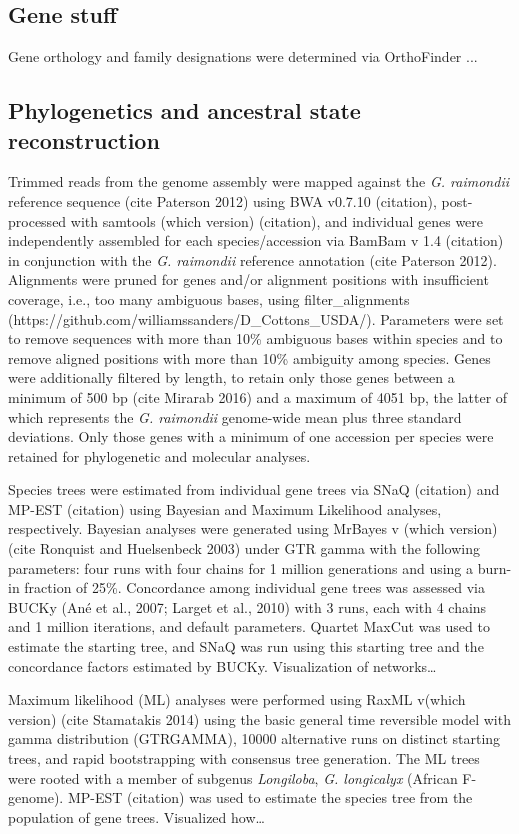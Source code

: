 \documentclass{bmcart}
\newcommand{\note}[2][]{\added[id=#1,remark={#2}]{}}
\begin{document}
\subsection*{Gene stuff}
Gene orthology and family designations were determined via OrthoFinder \note[Corrinne]{citation}...

\subsection*{Phylogenetics and ancestral state reconstruction}
Trimmed reads from the genome assembly were mapped against the \textit{G. raimondii} reference sequence (cite Paterson 2012) using BWA v0.7.10 (citation), post-processed with samtools (which version) (citation), and individual genes were independently assembled for each species/accession via BamBam v 1.4  (citation) in conjunction with the \textit{G. raimondii} reference annotation (cite Paterson 2012).  Alignments were pruned for genes and/or alignment positions with insufficient coverage, i.e., too many ambiguous bases, using filter\_alignments (https://github.com/williamssanders/D\_Cottons\_USDA/). Parameters were set  to remove sequences with more than 10\% ambiguous bases within species and to remove aligned positions with more than 10\% ambiguity among species. Genes were additionally filtered by length, to retain only those genes between a minimum of 500 bp (cite Mirarab 2016) and a maximum of 4051 bp, the latter of which represents the \textit{G. raimondii} genome-wide mean plus three standard deviations. Only those genes with a minimum of one accession per species were retained for phylogenetic and molecular analyses. 

Species trees were estimated from individual gene trees via SNaQ (citation) and MP-EST (citation) using Bayesian and Maximum Likelihood analyses, respectively. Bayesian analyses were generated using MrBayes v (which version) (cite Ronquist and Huelsenbeck 2003) under GTR gamma with the following parameters: four runs with four chains for 1 million generations and using a burn-in fraction of 25\%. Concordance among individual gene trees was assessed via BUCKy (Ané et al., 2007; Larget et al., 2010) with 3 runs, each with 4 chains and 1 million iterations, and default parameters. Quartet MaxCut was used to estimate the starting tree, and SNaQ was run using this starting tree and the concordance factors estimated by BUCKy. Visualization of networks\ldots

Maximum likelihood (ML) analyses were performed using RaxML v(which version) (cite Stamatakis 2014) using the basic general time reversible model with gamma distribution (GTRGAMMA), 10000 alternative runs on distinct starting trees, and rapid bootstrapping with consensus tree generation. The ML trees were rooted with a member of subgenus \textit{Longiloba}, \textit{G. longicalyx} (African F-genome). MP-EST (citation) was used to estimate the species tree from the population of gene trees.  Visualized how\ldots
\end{document}
